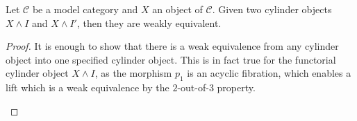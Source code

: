 \documentclass[../thesis.tex]{subfiles}
\begin{document}
            \begin{proposition}
                Let $\mathcal{C}$ be a model category and $X$ an object of $\mathcal{C}$. Given two cylinder objects $X\wedge I$ and $X\wedge I'$, then they are weakly equivalent. 
            \end{proposition}

            \begin{proof}
                It is enough to show that there is a weak equivalence from any cylinder object into one specified cylinder object. This is in fact true for the functorial cylinder object $X\wedge I$, as the morphism $p_1$ is an acyclic fibration, which enables a lift which is a weak equivalence by the $2$-out-of-$3$ property.

                \begin{center}
                \end{center}
            \end{proof}
\end{document}
